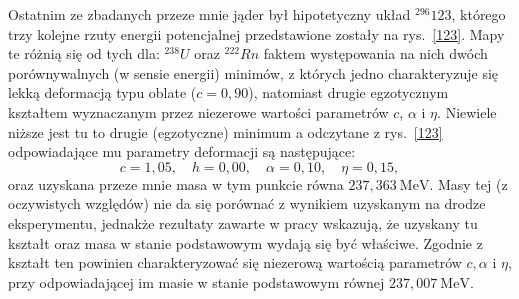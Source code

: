 \documentclass[a4paper,polish,twoside]{article}
\numberwithin{equation}{section}
\begin{document}
Ostatnim ze zbadanych przeze mnie jąder był hipotetyczny układ $^{296}123$, którego trzy kolejne rzuty energii potencjalnej przedstawione zostały na rys.~\ref{123}. Mapy te różnią się od tych dla: $^{238}U$ oraz $^{222}Rn$ faktem występowania na nich dwóch porównywalnych (w sensie energii) minimów, z których jedno charakteryzuje się lekką deformacją typu oblate ($c=0,90$), natomiast drugie egzotycznym kształtem wyznaczanym przez niezerowe wartości parametrów $c$, $\alpha$ i $\eta$. Niewiele niższe jest tu to drugie (egzotyczne) minimum a odczytane z rys.~\ref{123} odpowiadające mu parametry deformacji są następujące:
\begin{equation*}
c=1,05, \quad h= 0,00, \quad \alpha=0,10, \quad \eta= 0,15,
\end{equation*}
oraz uzyskana przeze mnie  masa w tym punkcie równa $237,363~\mathrm{MeV}$. Masy tej (z oczywistych względów) nie da się porównać z wynikiem uzyskanym na drodze eksperymentu, jednakże rezultaty zawarte w pracy \cite{A32} wskazują, że uzyskany tu kształt oraz masa w stanie podstawowym wydają się być właściwe. Zgodnie z \cite{A32} kształt ten powinien charakteryzować się niezerową wartością parametrów $c, \alpha$ i $\eta$, przy odpowiadającej im masie w stanie podstawowym równej $237,007~\mathrm{MeV}$. %
\end{document}
